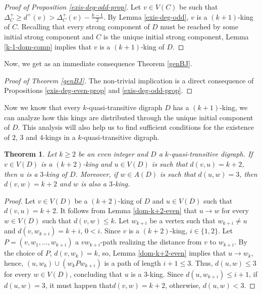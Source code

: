 \documentclass[preprint]{elsarticle}
\newtheorem{thm}{Theorem}[section]
\begin{document}
\begin{proof}[Proof of Proposition \ref{exis-deg-odd-prop}]
Let $v \in V(C)$ be such that $\Delta_C^+ \ge d^+ (v) > \Delta_C^+ (v) - \frac{k-1}{2}$.   By Lemma \ref{exis-deg-odd}, $v$ is a $(k+1)$-king of $C$.   Recalling that every strong component of $D$ must be reached by some initial strong component and $C$ is the unique initial strong component, Lemma \ref{k-1-dom-comp} implies that $v$ is a $(k+1)$-king of $D$.
\end{proof}

Now, we get as an immediate consequence Theorem \ref{genBJ}.

\begin{proof}[Proof of Theorem \ref{genBJ}]
The non-trivial implication is a direct consequence of Propositions \ref{exis-deg-even-prop} and \ref{exis-deg-odd-prop}.
\end{proof}


Now we know that every $k$-quasi-transitive digraph $D$ has a $(k+1)$-king, we can analyze how this kings are distributed through the unique initial component of $D$.   This analysis will also help us to find sufficient conditions for the existence of $2$, $3$ and $4$-kings in a $k$-quasi-transitive digraph.

\begin{thm} \label{k+2-3-king}
Let $k \ge 2$ be an even integer and $D$ a $k$-quasi-transitive digraph.   If $v \in V(D)$ is a $(k+2)$-king and $u \in V(D)$ is such that $d(v,u) = k+2$, then $u$ is a $3$-king of $D$.  Moreover, if $w \in A(D)$ is such that $d(u,w) = 3$, then $d(v,w) = k+2$ and $w$ is also a $3$-king. 
\end{thm}

\begin{proof}
Let $v \in V(D)$ be a $(k+2)$-king of $D$ and  $u \in V(D)$ such that $d(v,u) = k+2$.    It follows from Lemma \ref{dom-k+2-even} that $u \to w$ for every $w \in V(D)$ such that $d(v,w) \le k$.   Let $w_{k+i}$ be a vertex such that $w_{k+i} \ne u$ and $d(v, w_{k+i}) = k+i$, $0 < i$.  Since $v$ is a $(k+2)$-king, $i \in \{ 1, 2 \}$.   Let $P = (v, w_1, \dots, w_{k+i})$ a $v w_{k+i}$-path realizing the distance from $v$ to $w_{k+i}$.   By the choice of $P$, $d(v, w_k) = k$, so, Lemma \ref{dom-k+2-even} implies that $u \to w_k$, hence, $(u, w_k) \cup (w_k P w_{k+i})$ is a path of length $i + 1 \le 3$.   Thus, $d(u,w) \le 3$ for every $w \in V(D)$, concluding that $u$ is a $3$-king.   Since $d(u, w_{k+i}) \le i+1$, if $d(u, w) = 3$, it must happen that$d(v,w) = k+2$, otherwise,  $d(u,w) < 3$.
\end{proof}
\end{document}
